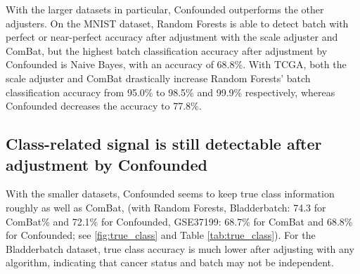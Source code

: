 With the larger datasets in particular, Confounded outperforms the other adjusters.
On the MNIST dataset, Random Forests is able to detect batch with perfect or near-perfect accuracy after adjustment with the scale adjuster and ComBat, but the highest batch classification accuracy after adjustment by Confounded is Naive Bayes, with an accuracy of 68.8\%.
With TCGA, both the scale adjuster and ComBat drastically increase Random Forests' batch classification accuracy from 95.0\% to 98.5\% and 99.9\% respectively, whereas Confounded decreases the accuracy to 77.8\%.

\subsection{Class-related signal is still detectable after adjustment by Confounded}

With the smaller datasets, Confounded seems to keep true class information roughly as well as ComBat, (with Random Forests, Bladderbatch: 74.3 for ComBat\% and 72.1\% for Confounded, GSE37199: 68.7\% for ComBat and 68.8\% for Confounded; see \figurename{} \ref{fig:true_class} and Table \ref{tab:true_class}).
For the Bladderbatch dataset, true class accuracy is much lower after adjusting with any algorithm, indicating that cancer status and batch may not be independent.

